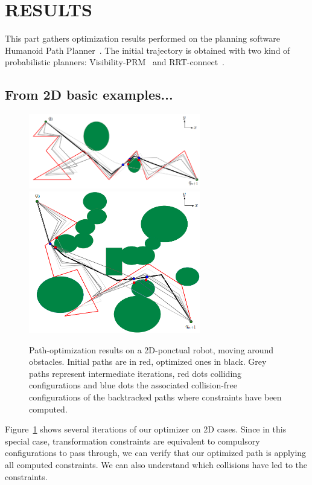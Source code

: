 \documentclass{tADR2e}
\begin{document}
\section{RESULTS}

This part gathers optimization results performed on the planning software 
Humanoid Path Planner~\cite{hpp}. The initial trajectory is obtained with two 
kind of probabilistic planners: Visibility-PRM~\cite{visibility-prm} and 
RRT-connect~\cite{rrt-connect}.

\subsection{From 2D basic examples...}

\begin{figure}[t]
	\centering
	\includegraphics[width=7.5cm]{2d_final_green.png}
	\includegraphics[width=7.5cm]{concave_final_green.png}
	\caption{Path-optimization results on a 2D-ponctual robot, moving around 
	obstacles. Initial paths are in red, optimized ones in black. Grey paths 
	represent intermediate iterations, red dots colliding configurations and blue 
	dots the associated collision-free configurations of the backtracked paths 
	where constraints have been computed.}
	\label{2D_long}
\end{figure}

Figure~\ref{2D_long} shows several iterations of our optimizer on 2D cases. Since 
in this special case, transformation constraints are equivalent to compulsory 
configurations to pass through, we can verify that our optimized path is applying 
all computed constraints. We can also understand which collisions have led to 
the constraints.
\end{document}
